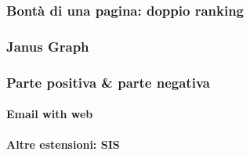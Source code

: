 			\subsubsection{Bontà di una pagina: doppio ranking}
			
			\subsubsection{Janus Graph}
			
			\subsubsection{Parte positiva \& parte negativa}
			
				\paragraph{Email with web}
				
				\paragraph{Altre estensioni: SIS}